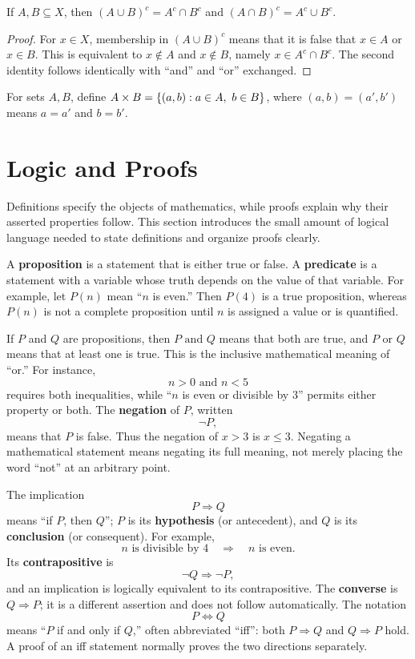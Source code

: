 \begin{proposition}
\label{prop:de-morgan}
If $A,B\subseteq X$, then $(A\cup B)^c=A^c\cap B^c$ and $(A\cap B)^c=A^c\cup B^c$.
\end{proposition}
\begin{proof}
For $x\in X$, membership in $(A\cup B)^c$ means that it is false that $x\in A$ or $x\in B$. This is equivalent to $x\notin A$ and $x\notin B$, namely $x\in A^c\cap B^c$. The second identity follows identically with ``and'' and ``or'' exchanged.
\end{proof}

\begin{definition}
For sets $A,B$, define $A\times B=\left\{(a,b):a\in A,\ b\in B\right\}$, where $(a,b)=(a',b')$ means $a=a'$ and $b=b'$.
\end{definition}

\section{Logic and Proofs}

Definitions specify the objects of mathematics, while proofs explain why
their asserted properties follow.  This section introduces the small amount
of logical language needed to state definitions and organize proofs clearly.

A \textbf{proposition} is a statement that is either true or false. A
\textbf{predicate} is a statement with a variable whose truth depends on
the value of that variable. For example, let \(P(n)\) mean ``\(n\) is
even.'' Then \(P(4)\) is a true proposition, whereas \(P(n)\) is not a
complete proposition until \(n\) is assigned a value or is quantified.

If \(P\) and \(Q\) are propositions, then \(P\text{ and }Q\) means that
both are true, and \(P\text{ or }Q\) means that at least one is true. This
is the inclusive mathematical meaning of ``or.'' For instance,
\[
n>0\text{ and }n<5
\]
requires both inequalities, while ``\(n\) is even or divisible by \(3\)''
permits either property or both. The \textbf{negation} of \(P\), written
\[
\neg P,
\]
means that \(P\) is false. Thus the negation of \(x>3\) is \(x\leq3\).
Negating a mathematical statement means negating its full meaning, not merely
placing the word ``not'' at an arbitrary point.

The implication
\[
P\Rightarrow Q
\]
means ``if \(P\), then \(Q\)''; \(P\) is its \textbf{hypothesis} (or
antecedent), and \(Q\) is its \textbf{conclusion} (or consequent). For
example,
\[
n\text{ is divisible by }4
\quad\Longrightarrow\quad
n\text{ is even}.
\]
Its \textbf{contrapositive} is
\[
\neg Q\Rightarrow\neg P,
\]
and an implication is logically equivalent to its contrapositive. The
\textbf{converse} is \(Q\Rightarrow P\); it is a different assertion and
does not follow automatically. The notation
\[
P\Longleftrightarrow Q
\]
means ``\(P\) if and only if \(Q\),'' often abbreviated ``iff'': both
\(P\Rightarrow Q\) and \(Q\Rightarrow P\) hold. A proof of an iff
statement normally proves the two directions separately.

